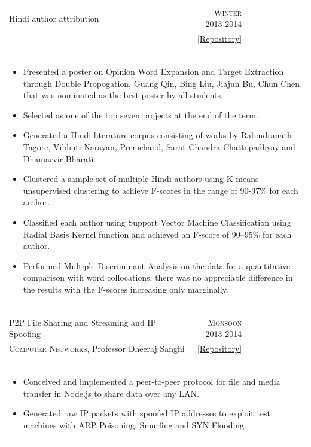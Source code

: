 \documentclass[a4paper,10pt]{article} %
\newcommand{\cproject}[5]{
    \begin{tabular}{p{0.80\linewidth}r}
        \textcolor{NavyBlue}{#2} & \multicolumn{1}{m{4cm}}{\raggedleft \textsc{#1}}\\
        #3 & #4
    \end{tabular}
    \begin{tabular}{p{\linewidth}}
    \vspace{-0.3cm}
        \footnotesize{#5}
    \end{tabular}
    \vspace{-0.5cm}
}
\begin{document}
\cproject
    {Winter 2013-2014}
    {Hindi author attribution}
    {\textsc{\raggedright Artificial Intelligence}, Professor Amitabha Mukherjee}
    { \href{https://github.com/srijanshetty/author-attribution}{ \footnotesize{[Repository]}} }
    {
     \begin{itemize}[leftmargin=0.5cm]
         \item Presented a poster on Opinion Word Expansion and Target Extraction through Double Propogation, Guang Qin,
             Bing Liu, Jiajun Bu, Chun Chen that was nominated as the best poster by all students.
         \item Selected as one of the top seven projects at the end of the term.
         \item Generated a Hindi literature corpus consisting of works by Rabindranath Tagore,
             Vibhuti Narayan, Premchand, Sarat Chandra Chattopadhyay and Dhamarvir Bharati.
         \item Clustered a sample set of multiple Hindi authors using K-means unsupervised clustering to achieve
             F-scores in the range of 90-97\% for each author.
         \item Classified each author using Support Vector Machine Classification using Radial Basis Kernel function
             and achieved an F-score of 90--95\% for each author.
         \item Performed Multiple Discriminant Analysis on the data for a quantitative comparison with word
             collocations; there was no appreciable difference in the results with the F-scores increasing only
             marginally.
     \end{itemize}
    }

\cproject
    {Monsoon 2013-2014}
    {P2P File Sharing and Streaming and IP Spoofing}
    {\textsc{Computer Networks}, Professor Dheeraj Sanghi}
    { \href{https://github.com/srijanshetty/nodesock}{ \footnotesize{[Repository]} } }
    {
        \begin{itemize}[leftmargin=0.5cm]
            \item Conceived and implemented a peer-to-peer protocol for file and media transfer in Node.js to share
                data over any LAN.
            \item Generated raw IP packets with spoofed IP addresses to exploit test machines with ARP Poisoning,
                Smurfing and SYN Flooding.
        \end{itemize}
    }
\end{document}
